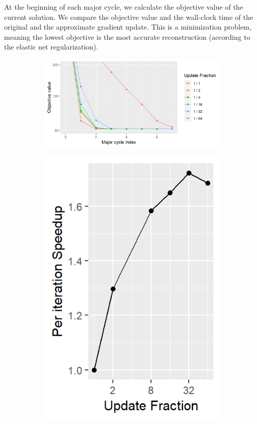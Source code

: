 At the beginning of each major cycle, we calculate the objective value of the current solution. We compare the objective value and the wall-clock time of the original and the approximate gradient update. This is a minimization problem, meaning the lowest objective is the most accurate reconstruction (according to the elastic net regularization).

\begin{figure}[h]
	\centering
	\begin{subfigure}[b]{0.58\linewidth}
		\includegraphics[width=\linewidth]{./chapters/10.results/gradient/ApproxUpdate/size.png}
	\end{subfigure}
	\begin{subfigure}[b]{0.195\linewidth}
		\includegraphics[width=\linewidth]{./chapters/10.results/gradient/ApproxUpdate/speedup_iter.png}

\end{subfigure}
\end{figure}
